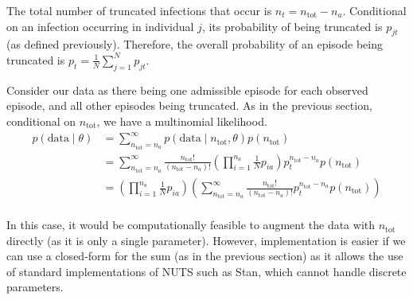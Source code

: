 \documentclass[main.tex]{subfiles}
\begin{document}
The total number of truncated infections that occur is
$n_t = n_\text{tot} - n_a$. Conditional on an infection occurring in
individual $j$, its probability of being truncated is $p_{jt}$ (as
defined previously). Therefore, the overall probability of an episode
being truncated is $p_t = \frac{1}{N} \sum_{j=1}^N p_{jt}$.

Consider our data as there being one admissible episode for each
observed episode, and all other episodes being truncated. As in the
previous section, conditional on $n_\text{tot}$, we have a multinomial
likelihood.
\begin{align}
p(\text{data} \mid \theta)
&= \sum_{n_\text{tot}=n_a}^\infty p(\text{data} \mid n_\text{tot}, \theta) p(n_\text{tot}) \\
&= \sum_{n_\text{tot}=n_a}^\infty \frac{n_\text{tot}!}{(n_\text{tot}-n_a)!} \left( \prod_{i=1}^{n_a} \frac{1}{N} p_{ia} \right) p_t^{n_\text{tot}-n_a} p(n_\text{tot}) \\
&= \left( \prod_{i=1}^{n_a} \frac{1}{N} p_{ia} \right) \left( \sum_{n_\text{tot}=n_a}^\infty \frac{n_\text{tot}!}{(n_\text{tot}-n_a)!} p_t^{n_\text{tot}-n_a} p(n_\text{tot}) \right) \\
\end{align}

In this case, it would be computationally feasible to augment the data
with $n_\text{tot}$ directly (as it is only a single parameter).
However, implementation is easier if we can use a closed-form for the
sum (as in the previous section) as it allows the use of standard
implementations of NUTS such as Stan, which cannot handle discrete
parameters.
\end{document}
